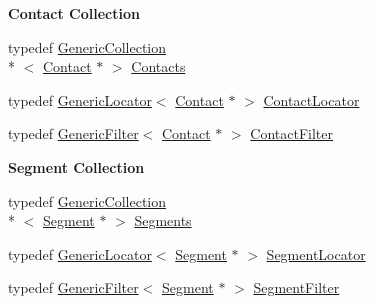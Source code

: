 \begin{Indent}{\bf Contact Collection}\par
\begin{DoxyCompactItemize}
\item 
typedef \hyperlink{classHurricane_1_1GenericCollection}{Generic\-Collection}\\*
$<$ \hyperlink{classHurricane_1_1Contact}{Contact} $\ast$ $>$ \hyperlink{namespaceHurricane_a1e6a8ab09f688509bd727b3fee02d0d2}{Contacts}
\item 
typedef \hyperlink{classHurricane_1_1GenericLocator}{Generic\-Locator}$<$ \hyperlink{classHurricane_1_1Contact}{Contact} $\ast$ $>$ \hyperlink{namespaceHurricane_a244811a7f36de747884f0c1ab1cc1025}{Contact\-Locator}
\item 
typedef \hyperlink{classHurricane_1_1GenericFilter}{Generic\-Filter}$<$ \hyperlink{classHurricane_1_1Contact}{Contact} $\ast$ $>$ \hyperlink{namespaceHurricane_a57f79232601d8739370debec00f89740}{Contact\-Filter}
\end{DoxyCompactItemize}
\end{Indent}
\begin{Indent}{\bf Segment Collection}\par
\begin{DoxyCompactItemize}
\item 
typedef \hyperlink{classHurricane_1_1GenericCollection}{Generic\-Collection}\\*
$<$ \hyperlink{classHurricane_1_1Segment}{Segment} $\ast$ $>$ \hyperlink{namespaceHurricane_a30748fa53a81cb597d4a13d651238716}{Segments}
\item 
typedef \hyperlink{classHurricane_1_1GenericLocator}{Generic\-Locator}$<$ \hyperlink{classHurricane_1_1Segment}{Segment} $\ast$ $>$ \hyperlink{namespaceHurricane_a37c8302c278e8c1c60c6ffc0222ec4c8}{Segment\-Locator}
\item 
typedef \hyperlink{classHurricane_1_1GenericFilter}{Generic\-Filter}$<$ \hyperlink{classHurricane_1_1Segment}{Segment} $\ast$ $>$ \hyperlink{namespaceHurricane_a891c4a2d614e158d183dada8b0ab1747}{Segment\-Filter}
\end{DoxyCompactItemize}
\end{Indent}

